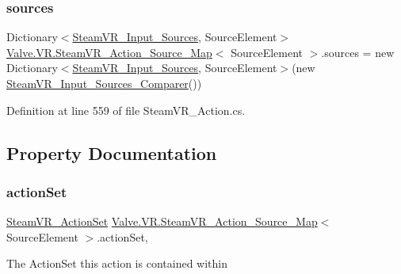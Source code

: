 \subsubsection{\texorpdfstring{sources}{sources}}
{\footnotesize\ttfamily Dictionary$<$\mbox{\hyperlink{namespace_valve_1_1_v_r_a82e5bf501cc3aa155444ee3f0662853f}{Steam\+V\+R\+\_\+\+Input\+\_\+\+Sources}}, Source\+Element$>$ \mbox{\hyperlink{class_valve_1_1_v_r_1_1_steam_v_r___action___source___map}{Valve.\+V\+R.\+Steam\+V\+R\+\_\+\+Action\+\_\+\+Source\+\_\+\+Map}}$<$ Source\+Element $>$.sources = new Dictionary$<$\mbox{\hyperlink{namespace_valve_1_1_v_r_a82e5bf501cc3aa155444ee3f0662853f}{Steam\+V\+R\+\_\+\+Input\+\_\+\+Sources}}, Source\+Element$>$(new \mbox{\hyperlink{struct_valve_1_1_v_r_1_1_steam_v_r___input___sources___comparer}{Steam\+V\+R\+\_\+\+Input\+\_\+\+Sources\+\_\+\+Comparer}}())\hspace{0.3cm}{\ttfamily [protected]}}



Definition at line 559 of file Steam\+V\+R\+\_\+\+Action.\+cs.



\subsection{Property Documentation}
\mbox{\label{class_valve_1_1_v_r_1_1_steam_v_r___action___source___map_a8a4f51dad7abd9b5b646ab3dc05f50ac}} 
\subsubsection{\texorpdfstring{actionSet}{actionSet}}
{\footnotesize\ttfamily \mbox{\hyperlink{class_valve_1_1_v_r_1_1_steam_v_r___action_set}{Steam\+V\+R\+\_\+\+Action\+Set}} \mbox{\hyperlink{class_valve_1_1_v_r_1_1_steam_v_r___action___source___map}{Valve.\+V\+R.\+Steam\+V\+R\+\_\+\+Action\+\_\+\+Source\+\_\+\+Map}}$<$ Source\+Element $>$.action\+Set\hspace{0.3cm}{\ttfamily [get]}, {}}



The Action\+Set this action is contained within 



